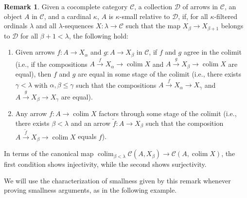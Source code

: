 \documentclass{amsart}
\theoremstyle{plain}
\theoremstyle{definition}
\newtheorem{remark}[theorem]{Remark}
\newcommand{\wt}{\widetilde}
\newcommand{\0}{\mathbf{0}}
\newcommand{\cC}{\mathcal C}
\newcommand{\cD}{\mathcal D}
\renewcommand{\(}{\left(}
\renewcommand{\)}{\right)}
\DeclareMathOperator*{\colim}{colim}
\begin{document}
\begin{remark}\label{nicer_description_of_smallness_conditions}
  Given a cocomplete category $\cC$, a collection $\cD$ of arrows in $\cC$, an object $A$ in $\cC$, and a cardinal $\kappa$, $A$ is $\kappa$-small relative to $\cD$, if, for all $\kappa$-filtered ordinals $\lambda$ and all $\lambda$-sequences $X:\lambda\to\cC$ such that the map $X_{\beta}\to X_{\beta+1}$ belongs to $\cD$ for all $\beta+1<\lambda$, the following hold:
  \begin{enumerate}[label=(\roman*)]
    \item Given arrows $f:A\to X_\alpha$ and $g:A\to X_{\beta}$ in $\cC$, if $f$ and $g$ agree in the colimit (i.e., if the compositions $A\xrightarrow{f} X_\alpha\to\colim X$ and $A\xrightarrow{g} X_{\beta}\to \colim X$ are equal), then $f$ and $g$ are equal in some stage of the colimit (i.e., there exists $\gamma<\lambda$ with $\alpha,\beta\leq\gamma$ such that the compositions $A\xrightarrow{f} X_\alpha\to X_\gamma$ and $A\xrightarrow{g} X_{\beta}\to X_{\gamma}$ are equal).
    \item Any arrow $f:A\to\colim X$ factors through some stage of the colimit (i.e., there exists $\beta<\lambda$ and an arrow $\wt f:A\to X_\beta$ such that the composition $A\xrightarrow{\wt f}X_\beta\to\colim X$ equals $f$).
  \end{enumerate}
  In terms of the canonical map $\colim_{\beta<\lambda}\cC(A,X_\beta)\to\cC(A,\colim X)$, the first condition shows injectivity, while the second shows surjectivity.
\end{remark}

We will use the characterization of smallness given by this remark whenever proving smallness arguments, as in the following example.
\end{document}
